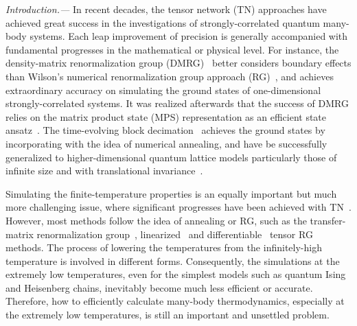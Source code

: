 \documentclass[aps,prl,twocolumn,superscriptaddress,a4paper,english,longbibliography]{revtex4-1}
\begin{document}
\maketitle

{\it Introduction.---}
In recent decades, the tensor network (TN) approaches have achieved great success in the investigations of strongly-correlated quantum many-body systems. Each leap improvement of precision is generally accompanied with fundamental progresses in the mathematical or physical level. For instance, the density-matrix renormalization group (DMRG)~\cite{PhysRevLett.69.2863, PhysRevB.48.10345} better considers boundary effects than Wilson's numerical renormalization group approach (RG)~\cite{PhysRevB.21.1003}, and achieves extraordinary accuracy on simulating the ground states of one-dimensional strongly-correlated systems. It was realized afterwards that the success of DMRG relies on the matrix product state (MPS) representation as an efficient state ansatz~\cite{PhysRevLett.75.3537, RevModPhys.77.259, RevModPhys.93.045003}. The time-evolving block decimation~\cite{PhysRevLett.91.147902, PhysRevLett.93.040502} achieves the ground states by incorporating with the idea of numerical annealing, and have be successfully generalized to higher-dimensional quantum lattice models particularly those of infinite size and with translational invariance~\cite{PhysRevLett.101.250602, 2017NatCo...8.1291K, PhysRevX.8.031031}.

Simulating the finite-temperature properties is an equally important but much more challenging issue, where significant progresses have been achieved with TN~\cite{Bursill_1996, PhysRevB.56.5061, *PhysRevB.58.9142, 1997JPSJ...66.2221S, PhysRevLett.93.207204, PhysRevLett.93.207205, PhysRevB.72.220401, PhysRevLett.102.190601, 2010NJPh...12e5026S, PhysRevLett.106.127202, PhysRevB.86.045139, PhysRevB.86.245101, *PhysRevB.92.035152, *PhysRevB.99.245107, PhysRevX.8.031031, PhysRevB.95.161104, *PhysRevX.8.031082, PhysRevLett.122.070502, PhysRevB.99.205132, 2019arXiv191003329C, PhysRevB.101.195119, PhysRevB.101.220409, PhysRevLett.125.170604}. However, most methods follow the idea of annealing or RG, such as the transfer-matrix renormalization group~\cite{PhysRevB.56.5061}, linearized~\cite{PhysRevLett.106.127202} and differentiable~\cite{PhysRevB.101.220409} tensor RG methods. The process of lowering the temperatures from the infinitely-high temperature is involved in different forms. Consequently, the simulations at the extremely low temperatures, even for the simplest models such as quantum Ising and Heisenberg chains, inevitably become much less efficient or accurate. Therefore, how to efficiently calculate many-body thermodynamics, especially at the extremely low temperatures, is still an important and unsettled problem.
\end{document}
